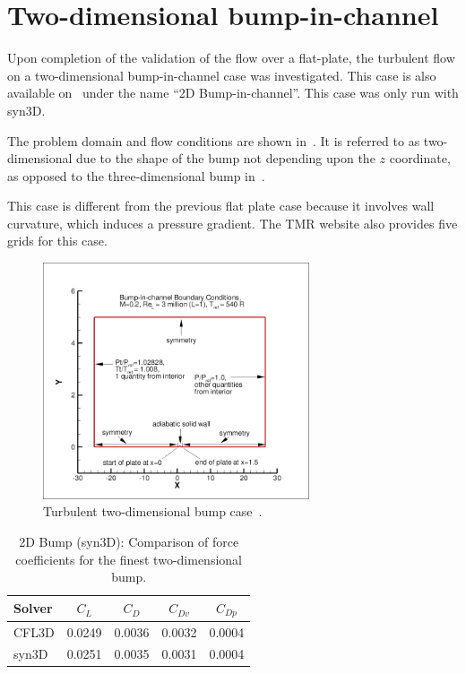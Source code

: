 \section{Two-dimensional bump-in-channel}
Upon completion of the validation of the flow over a flat-plate, the turbulent flow on a two-dimensional bump-in-channel case was investigated. This case is also available on~\cite{tmr} under the name ``2D Bump-in-channel''. This case was only run with syn3D.

The problem domain and flow conditions are shown in~. It is referred to as two-dimensional due to the shape of the bump not depending upon the $z$ coordinate, as opposed to the three-dimensional bump in~. 

This case is different from the previous flat plate case because it involves wall curvature, which induces a pressure gradient. The TMR website also provides five grids for this case. 
\begin{figure}
    \centering
    \includegraphics[width=0.7\textwidth]{figs/2dbump/bumpBCpic.jpg}
    \caption{Turbulent two-dimensional bump case~\cite{tmr}.}
    \label{fig:2dbump}
\end{figure}

\begin{table}[ht!]
    \centering
    \caption{2D Bump (syn3D): Comparison of force coefficients for the finest two-dimensional bump.}
\label{tab:syn2dbump1}
\begin{tabular}{@{}lcccc@{}}
\toprule
Solver & $C_L$ & $C_D$ & $C_{Dv}$ & $C_{Dp}$ \\  
\midrule
CFL3D & 0.0249 & 0.0036  & 0.0032 & 0.0004  \\ 
syn3D & 0.0251 &  0.0035 & 0.0031 & 0.0004  \\  \bottomrule
\end{tabular}

\end{table}

